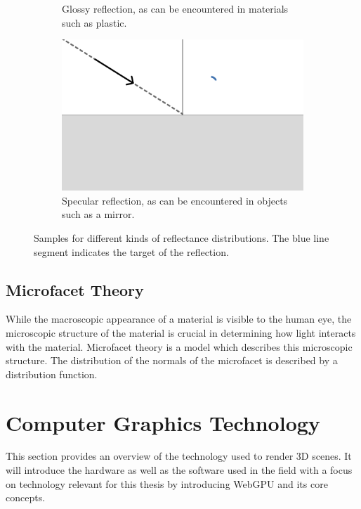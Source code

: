 \begin{figure}[H]
\begin{subfigure}[b]{0.45\textwidth}
    \caption{Glossy reflection, as can be encountered in materials such as plastic.}
    \label{fig:reflectionGlossy}
  \end{subfigure}
  \hfill
  \begin{subfigure}[b]{0.45\textwidth}
    \includegraphics[width=\textwidth]{resources/reflection-specular.png}
    \caption{Specular reflection, as can be encountered in objects such as a mirror.}
    \label{fig:reflectionSpecular}
  \end{subfigure}
  \caption{Samples for different kinds of reflectance distributions. The blue line segment indicates the target of the reflection. \cite{Pharr_Physically_Based_Rendering_2023}}
  \label{fig:brdf}
\end{figure}

\subsection{Microfacet Theory}

While the macroscopic appearance of a material is visible to the human eye, the microscopic structure of the material is crucial in determining how light interacts with the material. Microfacet theory is a model which describes this microscopic structure. The distribution of the normals of the microfacet is described by a distribution function.

\section{Computer Graphics Technology}

This section provides an overview of the technology used to render 3D scenes. It will introduce the hardware as well as the software used in the field with a focus on technology relevant for this thesis by introducing WebGPU and its core concepts.

